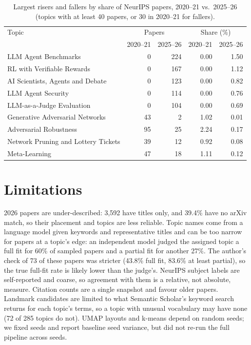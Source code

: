 \documentclass{article}
\begin{document}
\begin{table}[h]
\centering\small
\caption{Largest risers and fallers by share of NeurIPS papers, 2020--21 vs.\ 2025--26 (topics with at least 40 papers, or 30 in 2020--21 for fallers).}
\label{tab:trends}
\begin{tabular}{lrrrr}
\toprule
Topic & \multicolumn{2}{c}{Papers} & \multicolumn{2}{c}{Share (\%)} \\ & 2020--21 & 2025--26 & 2020--21 & 2025--26 \\
\midrule
LLM Agent Benchmarks & 0 & 224 & 0.00 & 1.50 \\
RL with Verifiable Rewards & 0 & 167 & 0.00 & 1.12 \\
AI Scientists, Agents and Debate & 0 & 123 & 0.00 & 0.82 \\
LLM Agent Security & 0 & 114 & 0.00 & 0.76 \\
LLM-as-a-Judge Evaluation & 0 & 104 & 0.00 & 0.69 \\
\midrule
Generative Adversarial Networks & 43 & 2 & 1.02 & 0.01 \\
Adversarial Robustness & 95 & 25 & 2.24 & 0.17 \\
Network Pruning and Lottery Tickets & 39 & 12 & 0.92 & 0.08 \\
Meta-Learning & 47 & 18 & 1.11 & 0.12 \\
\bottomrule
\end{tabular}
\end{table}





\section{Limitations}
2026 papers are under-described: 3{,}592 have titles only, and 39.4\% have no arXiv match, so their placement and topics are less reliable. Topic names come from a language model given keywords and representative titles and can be too narrow for papers at a topic's edge: an independent model judged the assigned topic a full fit for 60\% of sampled papers and a partial fit for another 27\%. The author's check of 73 of these papers was stricter (43.8\% full fit, 83.6\% at least partial), so the true full-fit rate is likely lower than the judge's. NeurIPS subject labels are self-reported and coarse, so agreement with them is a relative, not absolute, measure. Citation counts are a single snapshot and favour older papers. Landmark candidates are limited to what Semantic Scholar's keyword search returns for each topic's terms, so a topic with unusual vocabulary may have none (72 of 285 topics do not). UMAP layouts and k-means depend on random seeds; we fixed seeds and report baseline seed variance, but did not re-run the full pipeline across seeds.
\end{document}
